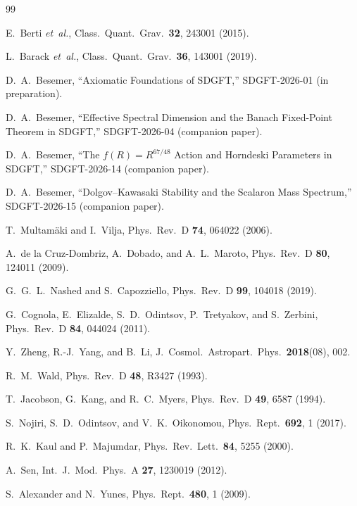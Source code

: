 \documentclass[amsmath,amssymb,aps,prd,twocolumn,superscriptaddress,nofootinbib]{revtex4-2}
\begin{document}
\begin{thebibliography}{99}

E.~Berti {\it et~al.},
Class.\ Quant.\ Grav.\ \textbf{32}, 243001 (2015).

L.~Barack {\it et~al.},
Class.\ Quant.\ Grav.\ \textbf{36}, 143001 (2019).

D.~A.~Besemer, ``Axiomatic Foundations of SDGFT,''
SDGFT-2026-01 (in preparation).

D.~A.~Besemer, ``Effective Spectral Dimension and the Banach
Fixed-Point Theorem in SDGFT,''
SDGFT-2026-04 (companion paper).

D.~A.~Besemer, ``The $f(R) = R^{67/48}$ Action and Horndeski
Parameters in SDGFT,''
SDGFT-2026-14 (companion paper).

D.~A.~Besemer, ``Dolgov--Kawasaki Stability and the Scalaron
Mass Spectrum,''
SDGFT-2026-15 (companion paper).

T.~Multam{\"a}ki and I.~Vilja,
Phys.\ Rev.\ D \textbf{74}, 064022 (2006).

A.~de la Cruz-Dombriz, A.~Dobado, and A.~L.~Maroto,
Phys.\ Rev.\ D \textbf{80}, 124011 (2009).

G.~G.~L.~Nashed and S.~Capozziello,
Phys.\ Rev.\ D \textbf{99}, 104018 (2019).

G.~Cognola, E.~Elizalde, S.~D.~Odintsov, P.~Tretyakov, and
S.~Zerbini,
Phys.\ Rev.\ D \textbf{84}, 044024 (2011).

Y.~Zheng, R.-J.~Yang, and B.~Li,
J.\ Cosmol.\ Astropart.\ Phys.\ \textbf{2018}(08), 002.

R.~M.~Wald,
Phys.\ Rev.\ D \textbf{48}, R3427 (1993).

T.~Jacobson, G.~Kang, and R.~C.~Myers,
Phys.\ Rev.\ D \textbf{49}, 6587 (1994).

S.~Nojiri, S.~D.~Odintsov, and V.~K.~Oikonomou,
Phys.\ Rept.\ \textbf{692}, 1 (2017).

R.~K.~Kaul and P.~Majumdar,
Phys.\ Rev.\ Lett.\ \textbf{84}, 5255 (2000).

A.~Sen,
Int.\ J.\ Mod.\ Phys.\ A \textbf{27}, 1230019 (2012).

S.~Alexander and N.~Yunes,
Phys.\ Rept.\ \textbf{480}, 1 (2009).


\end{thebibliography}
\end{document}
